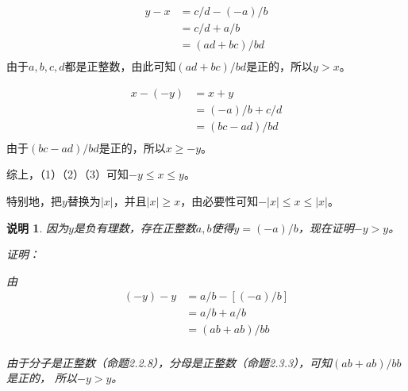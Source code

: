 \documentclass{article}
\theoremstyle{mystyle}
\newtheorem*{zremark}{说明}
\begin{document}
\begin{align*}
  y - x & = c/d - (-a)/b   \\
        & = c/d + a/b      \\
        & = (ad + bc) / bd \\
\end{align*}
由于$a,b,c,d$都是正整数，由此可知$(ad + bc) / bd$是正的，所以$y > x$。

\begin{align*}
  x - (-y) & = x + y        \\
           & = (-a)/b + c/d \\
           & = (bc - ad)/bd \\
\end{align*}
由于$(bc - ad)/bd$是正的，所以$x \geq -y$。

综上，（1）（2）（3）可知$-y \leq x \leq y$。

特别地，把$y$替换为$|x|$，并且$|x| \geq x$，由必要性可知$-|x| \leq x \leq |x|$。

\begin{zgraytheorem}
  \begin{zremark}
    因为$y$是负有理数，存在正整数$a,b$使得$y = (-a)/b$，现在证明$-y > y$。

    证明：

    由
    \begin{align*}
      (-y) - y & = a/b - [(-a)/b] \\
               & = a/b + a/b      \\
               & = (ab + ab)/bb   \\
    \end{align*}

    由于分子是正整数（命题2.2.8），分母是正整数（命题2.3.3），可知$(ab + ab)/bb$是正的，
    所以$-y > y$。
  \end{zremark}
\end{zgraytheorem}
\end{document}
